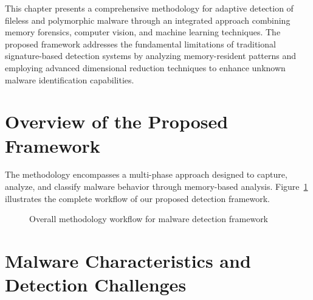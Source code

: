 This chapter presents a comprehensive methodology for adaptive detection of fileless and polymorphic malware through an integrated approach combining memory forensics, computer vision, and machine learning techniques. The proposed framework addresses the fundamental limitations of traditional signature-based detection systems by analyzing memory-resident patterns and employing advanced dimensional reduction techniques to enhance unknown malware identification capabilities.

\section{Overview of the Proposed Framework}
\label{sec:methodology-overview}

The methodology encompasses a multi-phase approach designed to capture, analyze, and classify malware behavior through memory-based analysis. Figure~\ref{fig:methodology-overview} illustrates the complete workflow of our proposed detection framework.

\begin{figure}[!htbp]
\centering
    \caption{Overall methodology workflow for malware detection framework}
    \label{fig:methodology-overview}
\end{figure}

\section{Malware Characteristics and Detection Challenges}
\label{sec:malware-characteristics}

